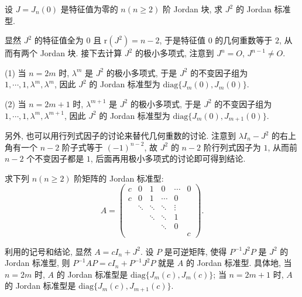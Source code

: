 \documentclass[../../main.tex]{subfiles}
\begin{document}
\begin{example}\label{example:J_n(0)的Jordan标准型}
设 $J = J_n(0)$ 是特征值为零的 $n(n \geqslant  2)$ 阶 Jordan 块, 求 $J^2$ 的 Jordan 标准型.
\end{example}
\begin{solution}
显然 $J^2$ 的特征值全为 $0$ 且 $\mathrm{r}(J^2) = n - 2$, 于是特征值 $0$ 的几何重数等于 $2$, 从而有两个 Jordan 块. 接下去计算 $J^2$ 的极小多项式, 注意到 $J^n = O$, $J^{n - 1} \neq O$.

(1) 当 $n = 2m$ 时, $\lambda^m$ 是 $J^2$ 的极小多项式, 于是 $J^2$ 的不变因子组为 $1,\cdots,1,\lambda^m,\lambda^m$, 因此 $J^2$ 的 Jordan 标准型为 $\mathrm{diag}\{J_m(0),J_m(0)\}$.

(2) 当 $n = 2m + 1$ 时, $\lambda^{m + 1}$ 是 $J^2$ 的极小多项式, 于是 $J^2$ 的不变因子组为 $1,\cdots,1,\lambda^m,\lambda^{m + 1}$, 因此 $J^2$ 的 Jordan 标准型为 $\mathrm{diag}\{J_m(0),J_{m + 1}(0)\}$.

另外, 也可以用行列式因子的讨论来替代几何重数的讨论. 注意到 $\lambda I_n - J^2$ 的右上角有一个 $n - 2$ 阶子式等于 $(-1)^{n - 2}$, 故 $J^2$ 的 $n - 2$ 阶行列式因子为 $1$, 从而前 $n - 2$ 个不变因子都是 $1$, 后面再用极小多项式的讨论即可得到结论.

\end{solution}

\begin{example}
求下列 $n(n \geqslant  2)$ 阶矩阵的 Jordan 标准型:
\[
A = \begin{pmatrix}
c & 0 & 1 & 0 & \cdots & 0 \\
c & 0 & 1 & \cdots & 0 \\
& \ddots & \ddots & \ddots & \vdots \\
& & \ddots & \ddots & 1 \\
& & & \ddots & 0 \\
& & & & & c
\end{pmatrix}.
\]
\end{example}
\begin{solution}
利用的记号和结论, 显然 $A = cI_n + J^2$. 设 $P$ 是可逆矩阵, 使得 $P^{-1}J^2P$ 是 $J^2$ 的 Jordan 标准型, 则 $P^{-1}AP = cI_n + P^{-1}J^2P$ 就是 $A$ 的 Jordan 标准型. 具体地, 当 $n = 2m$ 时, $A$ 的 Jordan 标准型是 $\mathrm{diag}\{J_m(c),J_m(c)\}$; 当 $n = 2m + 1$ 时, $A$ 的 Jordan 标准型是 $\mathrm{diag}\{J_m(c),J_{m + 1}(c)\}$.

\end{solution}

\vspace{0.5cm}
\end{document}
